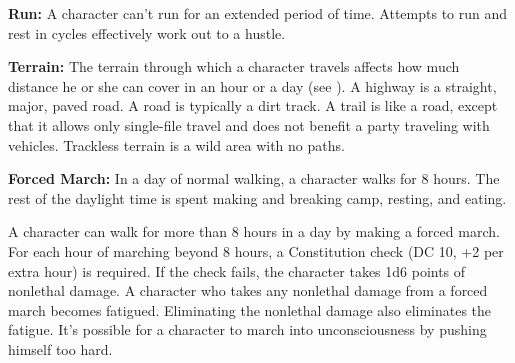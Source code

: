 \textbf{Run:} A character can't run for an extended period of time. Attempts to run and rest in cycles effectively work out to a hustle.

\textbf{Terrain:} The terrain through which a character travels affects how much distance he or she can cover in an hour or a day (see ). A highway is a straight, major, paved road. A road is typically a dirt track. A trail is like a road, except that it allows only single-file travel and does not benefit a party traveling with vehicles. Trackless terrain is a wild area with no paths.


\textbf{Forced March:} In a day of normal walking, a character walks for 8 hours. The rest of the daylight time is spent making and breaking camp, resting, and eating.

A character can walk for more than 8 hours in a day by making a forced march. For each hour of marching beyond 8 hours, a Constitution check (DC 10, +2 per extra hour) is required. If the check fails, the character takes 1d6 points of nonlethal damage. A character who takes any nonlethal damage from a forced march becomes fatigued. Eliminating the nonlethal damage also eliminates the fatigue. It's possible for a character to march into unconsciousness by pushing himself too hard.


